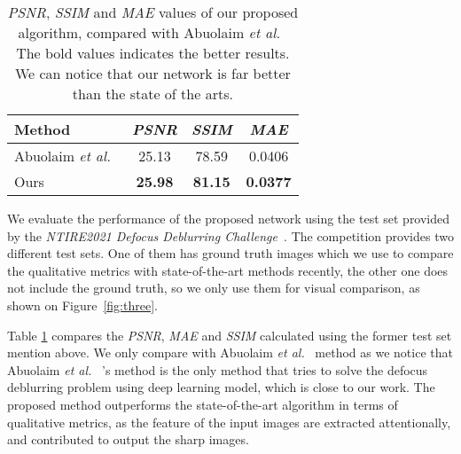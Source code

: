 \documentclass[final]{cvpr}
\begin{document}
\begin{table}
\begin{center}
\begin{tabular}{|l|c|c|c|}
\hline
Method & \textit{PSNR} & \textit{SSIM}  & \textit{MAE} \\
\hline\hline
Abuolaim \textit{et al.}~\cite{abuolaim2020defocus}  & 25.13 & 78.59  & 0.0406 \\
Ours &\textbf{25.98} & \textbf{81.15} & \textbf{0.0377} \\
\hline
\end{tabular}
\end{center}
\caption{\textit{PSNR}, \textit{SSIM} and \textit{MAE} values of our proposed algorithm, compared with Abuolaim \textit{et al.}~\cite{abuolaim2020defocus}  The bold values indicates the better results. We can notice that our network is far better than the state of the arts.}
\label{table:kysymys}
\end{table}

We evaluate the performance of the proposed network using the test set provided by the \textit{NTIRE2021 Defocus Deblurring Challenge~\cite{ntire}}. The competition provides two different test sets. One of them has ground truth images which we use to compare the qualitative metrics with state-of-the-art methods recently, the other one does not include the ground truth, so we only use them for visual comparison, as shown on Figure~\ref{fig:three}.

Table \ref{table:kysymys} compares the \textit{PSNR}, \textit{MAE} and \textit{SSIM} calculated using the former test set mention above. We only compare with Abuolaim \textit{et al.}~\cite{abuolaim2020defocus}  method as we notice that Abuolaim \textit{et al.}~\cite{abuolaim2020defocus} 's method is the only method that tries to solve the defocus deblurring problem using deep learning model, which is close to our work. The proposed method outperforms the state-of-the-art algorithm in terms of qualitative metrics, as the feature of the input images are extracted attentionally, and contributed to output the sharp images.
\end{document}
